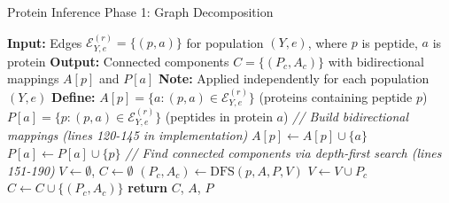 \documentclass{article}
\begin{document}
\begin{algorithm}[H]
\caption{Protein Inference Phase 1: Graph Decomposition}
\begin{algorithmic}[1]
\State \textbf{Input:} Edges $\mathcal{E}^{(r)}_{Y,e} = \{(p, a)\}$ for population $(Y, e)$, where $p$ is peptide, $a$ is protein
\State \textbf{Output:} Connected components $C = \{(P_c, A_c)\}$ with bidirectional mappings $A[p]$ and $P[a]$
\State \textbf{Note:} Applied independently for each population $(Y, e)$
\State \textbf{Define:} $A[p] = \{a : (p, a) \in \mathcal{E}^{(r)}_{Y,e}\}$ (proteins containing peptide $p$)
\State \hspace{2.3em} $P[a] = \{p : (p, a) \in \mathcal{E}^{(r)}_{Y,e}\}$ (peptides in protein $a$)
\State
\State \textit{// Build bidirectional mappings (lines 120-145 in implementation)}
    \State $A[p] \gets A[p] \cup \{a\}$ 
    \State $P[a] \gets P[a] \cup \{p\}$ 
\EndFor
\State
\State \textit{// Find connected components via depth-first search (lines 151-190)}
\State $V \gets \emptyset$, $C \gets \emptyset$ 
        \State $(P_c, A_c) \gets \text{DFS}(p, A, P, V)$ 
        \State $V \gets V \cup P_c$ 
        \State $C \gets C \cup \{(P_c, A_c)\}$
    \EndIf
\EndFor
\State
\State \textbf{return} $C$, $A$, $P$
\end{algorithmic}
\end{algorithm}
\end{document}
